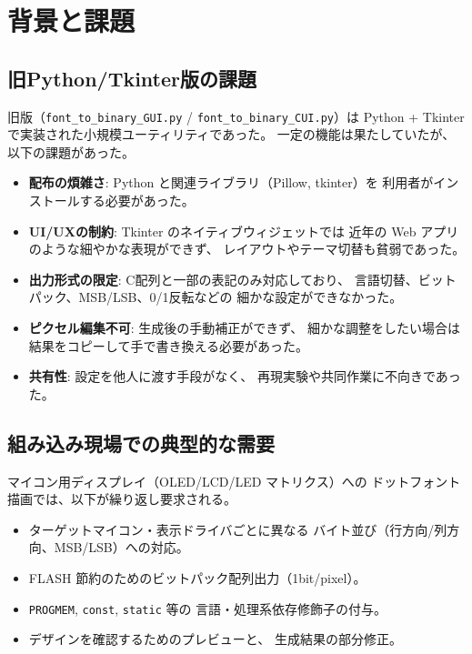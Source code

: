 \section{背景と課題}

\subsection{旧Python/Tkinter版の課題}

旧版（\texttt{font\_to\_binary\_GUI.py} / \texttt{font\_to\_binary\_CUI.py}）は
Python + Tkinter で実装された小規模ユーティリティであった。
一定の機能は果たしていたが、以下の課題があった。

\begin{itemize}[leftmargin=*,itemsep=2pt]
  \item \textbf{配布の煩雑さ}: Python と関連ライブラリ（Pillow, tkinter）を
        利用者がインストールする必要があった。
  \item \textbf{UI/UXの制約}: Tkinter のネイティブウィジェットでは
        近年の Web アプリのような細やかな表現ができず、
        レイアウトやテーマ切替も貧弱であった。
  \item \textbf{出力形式の限定}: C配列と一部の表記のみ対応しており、
        言語切替、ビットパック、MSB/LSB、0/1反転などの
        細かな設定ができなかった。
  \item \textbf{ピクセル編集不可}: 生成後の手動補正ができず、
        細かな調整をしたい場合は結果をコピーして手で書き換える必要があった。
  \item \textbf{共有性}: 設定を他人に渡す手段がなく、
        再現実験や共同作業に不向きであった。
\end{itemize}

\subsection{組み込み現場での典型的な需要}

マイコン用ディスプレイ（OLED/LCD/LED マトリクス）への
ドットフォント描画では、以下が繰り返し要求される。

\begin{itemize}[leftmargin=*,itemsep=2pt]
  \item ターゲットマイコン・表示ドライバごとに異なる
        バイト並び（行方向/列方向、MSB/LSB）への対応。
  \item FLASH 節約のためのビットパック配列出力（1bit/pixel）。
  \item \texttt{PROGMEM}, \texttt{const}, \texttt{static} 等の
        言語・処理系依存修飾子の付与。
  \item デザインを確認するためのプレビューと、
        生成結果の部分修正。
\end{itemize}

